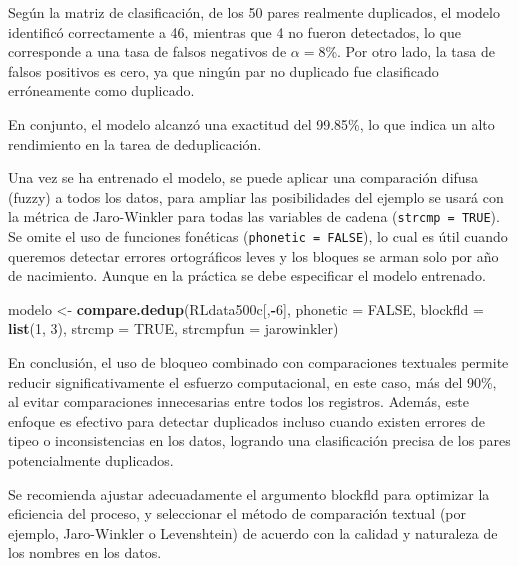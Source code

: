 \documentclass[
  12pt,
]{book}
\newenvironment{Shaded}{\begin{snugshade}}{\end{snugshade}}
\newcommand{\AttributeTok}[1]{\textcolor[rgb]{0.13,0.29,0.53}{#1}}
\newcommand{\ConstantTok}[1]{\textcolor[rgb]{0.56,0.35,0.01}{#1}}
\newcommand{\DecValTok}[1]{\textcolor[rgb]{0.00,0.00,0.81}{#1}}
\newcommand{\FunctionTok}[1]{\textcolor[rgb]{0.13,0.29,0.53}{\textbf{#1}}}
\newcommand{\NormalTok}[1]{#1}
\newcommand{\OtherTok}[1]{\textcolor[rgb]{0.56,0.35,0.01}{#1}}
\newcommand{\SpecialCharTok}[1]{\textcolor[rgb]{0.81,0.36,0.00}{\textbf{#1}}}
\begin{document}
Según la matriz de clasificación, de los 50 pares realmente duplicados, el modelo identificó correctamente a 46, mientras que 4 no fueron detectados, lo que corresponde a una tasa de falsos negativos de \(\alpha = 8\)\%. Por otro lado, la tasa de falsos positivos es cero, ya que ningún par no duplicado fue clasificado erróneamente como duplicado.

En conjunto, el modelo alcanzó una exactitud del 99.85\%, lo que indica un alto rendimiento en la tarea de deduplicación.

Una vez se ha entrenado el modelo, se puede aplicar una comparación difusa (fuzzy) a todos los datos, para ampliar las posibilidades del ejemplo se usará con la métrica de Jaro-Winkler para todas las variables de cadena (\texttt{strcmp\ =\ TRUE}). Se omite el uso de funciones fonéticas (\texttt{phonetic\ =\ FALSE}), lo cual es útil cuando queremos detectar errores ortográficos leves y los bloques se arman solo por año de nacimiento. Aunque en la práctica se debe especificar el modelo entrenado.

\begin{Shaded}
\begin{Highlighting}[]
\NormalTok{modelo }\OtherTok{\textless{}{-}} \FunctionTok{compare.dedup}\NormalTok{(RLdata500c[,}\SpecialCharTok{{-}}\DecValTok{6}\NormalTok{],}
                        \AttributeTok{phonetic =} \ConstantTok{FALSE}\NormalTok{,}
                        \AttributeTok{blockfld =} \FunctionTok{list}\NormalTok{(}\DecValTok{1}\NormalTok{, }\DecValTok{3}\NormalTok{),}
                        \AttributeTok{strcmp =} \ConstantTok{TRUE}\NormalTok{,}
                        \AttributeTok{strcmpfun =}\NormalTok{ jarowinkler)}
\end{Highlighting}
\end{Shaded}

En conclusión, el uso de bloqueo combinado con comparaciones textuales permite reducir significativamente el esfuerzo computacional, en este caso, más del 90\%, al evitar comparaciones innecesarias entre todos los registros. Además, este enfoque es efectivo para detectar duplicados incluso cuando existen errores de tipeo o inconsistencias en los datos, logrando una clasificación precisa de los pares potencialmente duplicados.

Se recomienda ajustar adecuadamente el argumento blockfld para optimizar la eficiencia del proceso, y seleccionar el método de comparación textual (por ejemplo, Jaro-Winkler o Levenshtein) de acuerdo con la calidad y naturaleza de los nombres en los datos.
\end{document}
